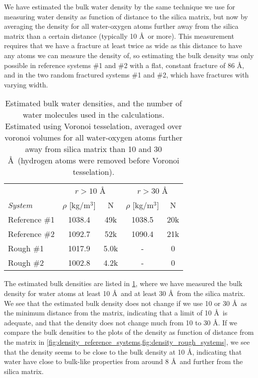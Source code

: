 We have estimated the bulk water density by the same technique we use for measuring water density as function of distance to the silica matrix, but now by averaging the density for all water-oxygen atoms further away from the silica matrix than a certain distance (typically 10 \AA\ or more). This measurement requires that we have a fracture at least twice as wide as this distance to have any atoms we can measure the density of, so estimating the bulk density was only possible in reference systems \#1 and \#2 with a flat, constant fracture of 86 \AA, and in the two random fractured systems \#1 and \#2, which have fractures with varying width. %
%
\begin{table}[!htb]%
    \centering%
    \begin{tabular}{l|cc|cc}%
    ~               & \multicolumn{2}{c|}{$r>10$ \AA}& \multicolumn{2}{c}{$r>30$ \AA}    \\
    \textit{System} & $\rho$ [kg/m$^3$]     & N     & $\rho$ [kg/m$^3$]     & N   \\ \hline
    Reference \#1   & 1038.4                & 49k   & 1038.5                & 20k \\
    Reference \#2   & 1092.7                & 52k   & 1090.4                & 21k \\
    Rough \#1       & 1017.9                & 5.0k  & -                     & 0   \\
    Rough \#2       & 1002.8                & 4.2k  & -                     & 0   \\
    \end{tabular}%
    \vspace{8pt}%
    \caption{%
        Estimated bulk water densities, and the number of water molecules used in the calculations. Estimated using Voronoi tesselation, averaged over voronoi volumes for all water-oxygen atoms further away from silica matrix than 10 and 30 \AA\ (hydrogen atoms were removed before Voronoi tesselation). %
        \label{tab:bulk_water_density}%
    }%
\end{table}%

The estimated bulk densities are listed in \cref{tab:bulk_water_density}, where we have measured the bulk density for water atoms at least 10 \AA\ and at least 30 \AA\ from the silica matrix. We see that the estimated bulk density does not change if we use 10 or 30 \AA\ as the minimum distance from the matrix, indicating that a limit of 10 \AA\ is adequate, and that the density does not change much from 10 to 30 \AA. If we compare the bulk densities to the plots of the density as function of distance from the matrix in \cref{fig:density_reference_systems,fig:density_rough_systems}, we see that the density seems to be close to the bulk density at 10 \AA, indicating that water have close to bulk-like properties from around 8 \AA\ and further from the silica matrix.


